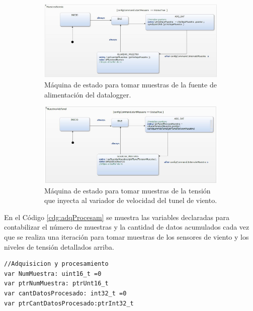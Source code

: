 \begin{figure}[H]
    \centering
    \begin{subfigure}[b]{0.9\textwidth}
        \centering
        \includegraphics[width=\linewidth]{Figuras/datalogger/Firmware/muestreBat.jpg}
        \caption{Máquina de estado para tomar muestras de la fuente de alimentación del datalogger.}
        \label{fig:muestreBat}
    \end{subfigure}\hspace{0.09\textwidth}
    \begin{subfigure}[b]{0.9\textwidth}
        \centering
        \includegraphics[width=\linewidth]{Figuras/datalogger/Firmware/muestreAdc.jpg}
        \caption{Máquina de estado para tomar muestras de la tensión que inyecta al variador de velocidad del tunel de viento.}
        \label{fig:muestreAdc}
    \end{subfigure}
    \caption{}
    \label{fig:mainFigure}
\end{figure}

En el Código \ref{cdg:adqProcesam} se muestra las variables declaradas para contabilizar el número de muestras y la cantidad de datos acumulados cada vez que se realiza una iteración para tomar muestras de los sensores de viento y los niveles de tensión detallados arriba. 


\begin{lstlisting}[style=yakindustyle, caption={Varibles para controlar la adquisición y procesamiento de los datos .}, label=cdg:adqProcesam,basicstyle=\ttfamily\fontsize{8}{8}\selectfont]
//Adquisicion y procesamiento
var NumMuestra: uint16_t =0
var ptrNumMuestra: ptrUnt16_t
var cantDatosProcesado: int32_t =0
var ptrCantDatosProcesado:ptrInt32_t
\end{lstlisting}


